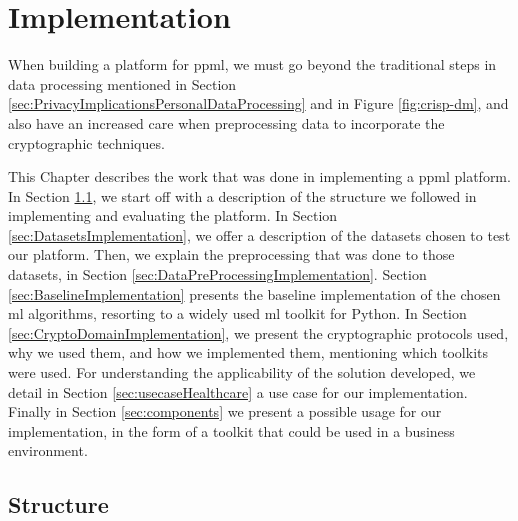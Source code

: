 %

\acresetall

\chapter{Implementation}
\label{ch:Implementation}

When building a platform for \ac{ppml}, we must go beyond the traditional steps in data processing mentioned in Section \ref{sec:PrivacyImplicationsPersonalDataProcessing} and in Figure \ref{fig:crisp-dm}, and also have an increased care when preprocessing data to incorporate the cryptographic techniques.

This Chapter describes the work that was done in implementing a \ac{ppml} platform. In Section \ref{sec:StructureImplementation}, we start off with a description of the structure we followed in implementing and evaluating the platform.
In Section \ref{sec:DatasetsImplementation}, we offer a description of the datasets chosen to test our platform. Then, we explain the preprocessing that was done to those datasets, in Section \ref{sec:DataPreProcessingImplementation}.
Section \ref{sec:BaselineImplementation} presents the baseline implementation of the chosen \ac{ml} algorithms, resorting to a widely used \ac{ml} toolkit for Python.
In Section \ref{sec:CryptoDomainImplementation}, we present the cryptographic protocols used, why we used them, and how we implemented them, mentioning which toolkits were used.
For understanding the applicability of the solution developed, we detail in Section \ref{sec:usecaseHealthcare} a use case for our implementation. Finally in Section \ref{sec:components} we present a possible usage for our implementation, in the form of a toolkit that could be used in a business environment.









\section{Structure}
\label{sec:StructureImplementation}

